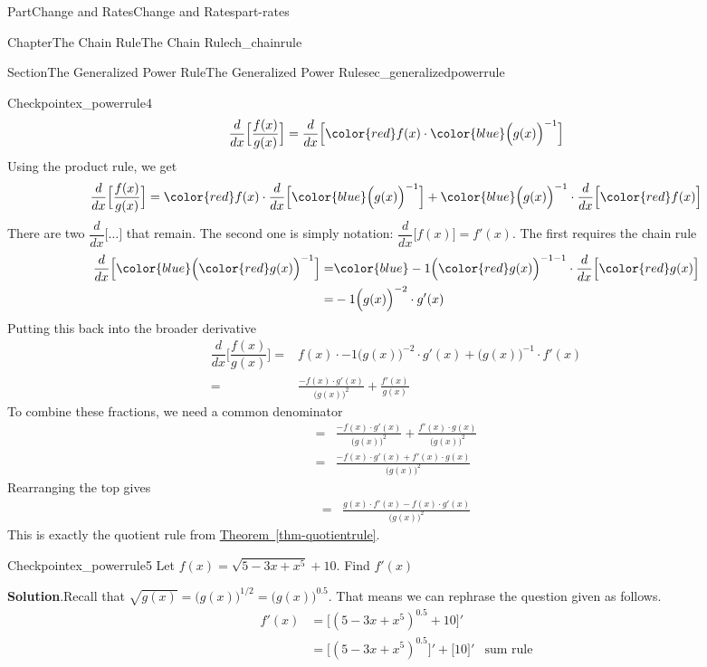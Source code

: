 \documentclass[oneside,10pt,]{tufte-book}
\newcommand{\blocktitlefont}{\relax}
\newcommand{\xreffont}{\relax}
\numberwithin{equation}{chapter}
\newcommand{\red}[1]{   {\color{red}   #1}   }
\newcommand{\blue}[1]{  {\color{blue}  #1}  }
\newcommand{\ddx}[1]{ \dfrac{d}{dx} \Big[ #1 \Big]  }
\newcommand{\D}[1]{ \Big[ #1 \Big]'  }
\newcommand{\amp}{&}
\begin{document}
\begin{partptx}{Part}{Change and Rates}{}{Change and Rates}{}{}{part-rates}
\begin{chapterptx}{Chapter}{The Chain Rule}{}{The Chain Rule}{}{}{ch_chainrule}
\begin{sectionptx}{Section}{The Generalized Power Rule}{}{The Generalized Power Rule}{}{}{sec_generalizedpowerrule}
\begin{inlineexercise}{Checkpoint}{}{ex_powerrule4}
\begin{equation*}
\ddx{ \dfrac{f(x)}{g(x)} }  = \ddx{ \red{f(x)}\cdot \blue{ \Big(g(x)\Big)^{-1}} } 
\end{equation*}
Using the product rule, we get%
\begin{equation*}
\ddx{ \dfrac{f(x)}{g(x)} }  = \red{f(x)}\cdot \ddx{ \blue{ \Big(g(x)\Big)^{-1}} } +  \blue{ \Big(g(x)\Big)^{-1}}\cdot \ddx{ \red{f(x)}  } 
\end{equation*}
There are two \(\ddx{\dots}\) that remain.  The second one is simply notation: \(\ddx{f(x)} = f'(x)\). The first requires the chain rule%
\begin{align*}
\ddx{ \blue{ \Big( \red{g(x)} \Big)^{-1} }  } = \amp \blue{-1 \Big(\red{g(x)} \Big)^{-1-1}} \cdot \ddx{\red{g(x)}} \\
= \amp -1 \Big(g(x)\Big)^{-2}\cdot g'(x)
\end{align*}
Putting this back into the broader derivative%
\begin{align*}
\ddx{ \dfrac{f(x)}{g(x)} }  = \amp f(x) \cdot -1 \Big(g(x))^{-2}\cdot g'(x) +   \Big(g(x)\Big)^{-1}\cdot  f'(x)   \\
=  \amp \frac{-f(x)\cdot g'(x)}{\Big(g(x)\Big)^2} + \frac{f'(x)}{g(x)} 
\end{align*}
To combine these fractions, we need a common denominator%
\begin{align*}
=  \amp \frac{-f(x)\cdot g'(x)}{\Big(g(x)\Big)^2} + \frac{f'(x)\cdot g(x)}{\Big(g(x)\Big)^2} \\
=  \amp \frac{-f(x)\cdot g'(x) + f'(x)\cdot g(x)}{\Big(g(x)\Big)^2} 
\end{align*}
Rearranging the top gives%
\begin{align*}
=  \amp \frac{ g(x)\cdot f'(x) - f(x)\cdot g'(x) }{\Big(g(x)\Big)^2} 
\end{align*}
This is exactly the quotient rule from \hyperref[thm-quotientrule]{Theorem~{\xreffont\ref{thm-quotientrule}}}.%
\end{inlineexercise}%
\begin{inlineexercise}{Checkpoint}{}{ex_powerrule5}%
Let \(f(x) = \sqrt{5-3x+x^5} + 10 \).  Find \(f'(x)\)%
\par\smallskip%
\noindent\textbf{\blocktitlefont Solution}.\hypertarget{ex_powerrule5-2}{}\quad{}Recall that \(\sqrt{g(x)} = \Big(g(x)\Big)^{1/2} =\Big(g(x)\Big)^{0.5}  \).  That means we can rephrase the question given as follows.%
\begin{align*}
f'(x) \amp = \D{ (5-3x+x^5)^{0.5} + 10 } \\
\amp =  \D{ (5-3x+x^5)^{0.5} }  + \D{ 10 } \amp \text{sum rule}\\

\end{align*}
\end{inlineexercise}
\end{sectionptx}
\end{chapterptx}
\end{partptx}
\end{document}

